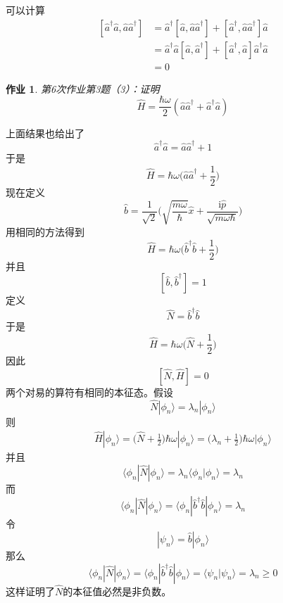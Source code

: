 \documentclass[12pt]{article}
\newtheorem{asg}{作业}
\begin{document}
    可以计算
    \begin{equation}\begin{aligned}
        [\hat{a}^\dagger\hat{a}, \hat{a}\hat{a}^\dagger] &= \hat{a}^\dagger [\hat{a},\hat{a}\hat{a}^\dagger] +  [\hat{a}^\dagger,\hat{a}\hat{a}^\dagger]\hat{a}\\
        &= \hat{a}^\dagger\hat{a}[\hat{a},\hat{a}^\dagger] + [\hat{a}^\dagger,\hat{a}]\hat{a}^\dagger \hat{a}\\
        &= 0
    \end{aligned}\end{equation}
    \begin{asg}
        第6次作业第3题（3）：证明
        \[ \hat{H} = \frac {\hbar \omega}2 (\hat{a}\hat{a}^\dagger + \hat{a}^\dagger \hat{a}) \]
    \end{asg}
    上面结果也给出了
    \[ \hat{a}^\dagger\hat{a} = \hat{a}\hat{a}^\dagger + 1 \]
    于是
    \[ \hat{H} = \hbar \omega\bigg(\hat{a}\hat{a}^\dagger + \frac 12\bigg)\]
    现在定义
    \[ \hat{b} = \frac 1{\sqrt{2}}\bigg(\sqrt{\frac {m\omega}{\hbar}}\hat{x} + \frac {\mathrm{i}\hat{p}}{\sqrt{m\omega\hbar}}\bigg) \]
    用相同的方法得到 
    \[ \hat{H} = \hbar \omega\bigg(\hat{b}^\dagger\hat{b}+ \frac 12\bigg) \]
    并且
    \[ [\hat{b}, \hat{b}^\dagger] = 1 \]
    定义
    \[ \hat{N} = \hat{b}^\dagger\hat{b} \]
    于是
    \[ \hat{H} = \hbar \omega \bigg(\hat{N}+\frac 12\bigg) \]
    因此 
    \[ [\hat{N},\hat{H}] = 0 \]
    两个对易的算符有相同的本征态。假设
    \[ \hat{N}|\phi_n \rangle = \lambda_n |\phi_n \rangle \]
    则
    \begin{equation}\begin{aligned}
        \hat{H}|\phi_n \rangle = \bigg(\hat{N}+\frac 12\bigg)\hbar\omega|\phi_n \rangle = \bigg(\lambda_n + \frac 12\bigg)\hbar\omega|\phi_n\rangle
    \end{aligned}\end{equation}
    并且
    \[ \langle \phi_n|\hat{N}|\phi_n \rangle = \lambda_n \langle \phi_n |\phi_n \rangle = \lambda_n \]
    而
    \[ \langle \phi_n|\hat{N}|\phi_n \rangle =  \langle \phi_n |\hat{b}^\dagger\hat{b}|\phi_n \rangle = \lambda_n \]
    令
    \[ |\psi_n \rangle = \hat{b}|\phi_n\rangle \]
    那么
    \[ \langle \phi_n|\hat{N}|\phi_n \rangle =  \langle \phi_n |\hat{b}^\dagger\hat{b}|\phi_n \rangle = \langle \psi_n|\psi_n \rangle = \lambda_n \geqslant 0 \]
    这样证明了$\hat{N}$的本征值必然是非负数。
\end{document}
